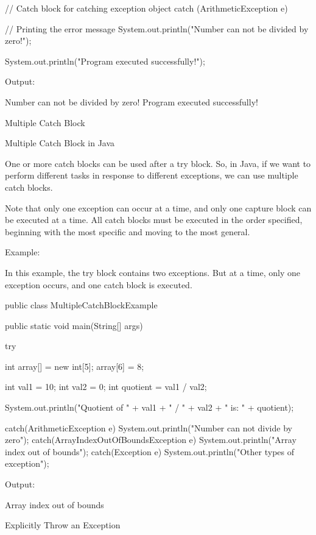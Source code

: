 {{{        // Catch block for catching exception object
        catch (ArithmeticException e) {

            // Printing the error message
            System.out.println("Number can not be divided by zero!");
        }

        System.out.println("Program executed successfully!");
    }
}
 

Output:
 

Number can not be divided by zero!
Program executed successfully!



 
Multiple Catch Block
 

 

Multiple Catch Block in Java
 

One or more catch blocks can be used after a try block. So, in Java, if we want to perform different tasks in response to different exceptions, we can use multiple catch blocks.

Note that only one exception can occur at a time, and only one capture block can be executed at a time. All catch blocks must be executed in the order specified, beginning with the most specific and moving to the most general.

 

Example:
 

In this example, the try block contains two exceptions. But at a time, only one exception occurs, and one catch block is executed.

 

public class MultipleCatchBlockExample {

	public static void main(String[] args) {
		
		try {
			int array[] = new int[5];
			array[6] = 8;
			
			int val1 = 10;
			int val2 = 0;
			int quotient = val1 / val2;
			
			System.out.println("Quotient of " + val1 + " / " + val2 + " is: " + quotient);
		}
		catch(ArithmeticException e) {
			System.out.println("Number can not divide by zero");
		}
		catch(ArrayIndexOutOfBoundsException e) {
			System.out.println("Array index out of bounds");
		}
		catch(Exception e) {
			System.out.println("Other types of exception");
		}
	}
}
 

Output:
 

Array index out of bounds


Explicitly Throw an Exception
 

}
